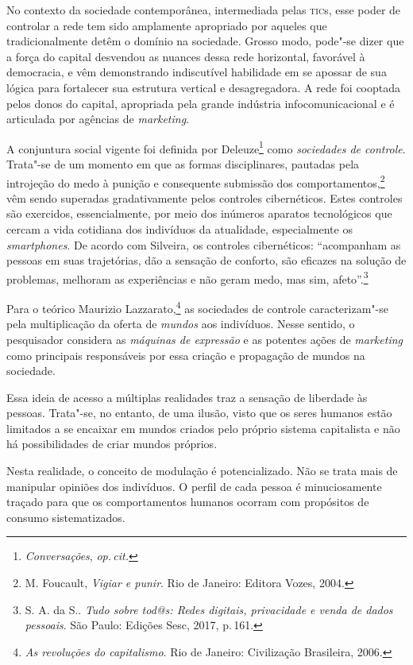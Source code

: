 No contexto da sociedade contemporânea, intermediada pelas \textsc{tic}s, esse
poder de controlar a rede tem sido amplamente apropriado por aqueles que
tradicionalmente detêm o domínio na sociedade. Grosso modo, pode"-se
dizer que a força do capital desvendou as nuances dessa rede horizontal,
favorável à democracia, e vêm demonstrando indiscutível habilidade em se
apossar de sua lógica para fortalecer sua estrutura vertical e
desagregadora. A rede foi cooptada pelos donos do capital, apropriada
pela grande indústria infocomunicacional e é articulada por agências de
\textit{marketing}.

A conjuntura social vigente foi definida por Deleuze\footnote{\textit{Conversações}, \textit{op.\,cit.}} como
\textit{sociedades de controle}. Trata"-se de um momento em que as formas
disciplinares, pautadas pela introjeção do medo à punição e consequente
submissão dos comportamentos,\footnote{M. Foucault, \textit{Vigiar e punir}. Rio de Janeiro: Editora Vozes, 2004.} vêm sendo superadas
gradativamente pelos controles cibernéticos. Estes controles são
exercidos, essencialmente, por meio dos inúmeros aparatos tecnológicos
que cercam a vida cotidiana dos indivíduos da atualidade, especialmente
os \textit{smartphones}. De acordo com Silveira, os
controles cibernéticos: ``acompanham as pessoas em suas trajetórias, dão
a sensação de conforto, são eficazes na solução de problemas, melhoram
as experiências e não geram medo, mas sim, afeto''.\footnote{S. A. da S.. \textit{Tudo sobre tod@s: Redes digitais, privacidade e venda de dados pessoais}. São Paulo: Edições Sesc, 2017, p.\,161.}

Para o teórico Maurizio Lazzarato,\footnote{\textit{As revoluções do capitalismo}. Rio de
Janeiro: Civilização Brasileira, 2006.} as sociedades de controle
caracterizam"-se pela multiplicação da oferta de \textit{mundos} aos
indivíduos. Nesse sentido, o pesquisador considera as \textit{máquinas de
expressão} e as potentes ações de \textit{marketing} como principais
responsáveis por essa criação e propagação de mundos na sociedade.

Essa ideia de acesso a múltiplas realidades traz a sensação de liberdade
às pessoas. Trata"-se, no entanto, de uma ilusão, visto que os seres
humanos estão limitados a se encaixar em mundos criados pelo próprio
sistema capitalista e não há possibilidades de criar mundos próprios.

Nesta realidade, o conceito de modulação é potencializado. Não se trata
mais de manipular opiniões dos indivíduos. O perfil de cada pessoa é
minuciosamente traçado para que os comportamentos humanos ocorram com
propósitos de consumo sistematizados.

